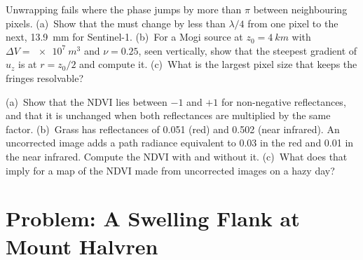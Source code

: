 \begin{exercise}[$\star\star\star$]\label{exo:b3:remote-sensing-gis:11}
Unwrapping fails where the phase jumps by more than $\pi$ between
neighbouring pixels. (a)~Show that the  must change by less
than $\lambda/4$ from one pixel to the next, \qty{13.9}{mm} for
Sentinel-1. (b)~For a Mogi source at $z_0 = \qty{4}{km}$ with $\Delta V =
\qty{e7}{m^3}$ and $\nu = 0.25$, seen vertically, show that the steepest
gradient of $u_z$ is at $r = z_0/2$ and compute it. (c)~What is the
largest pixel size that keeps the fringes resolvable?
\end{exercise}

\begin{exercise}[$\star\star\star$]\label{exo:b3:remote-sensing-gis:12}
(a)~Show that the NDVI lies between $-1$ and $+1$ for non-negative
reflectances, and that it is unchanged when both reflectances are
multiplied by the same factor. (b)~Grass has reflectances of 0.051 (red)
and 0.502 (near infrared). An uncorrected image adds a path radiance
equivalent to 0.03 in the red and 0.01 in the near infrared. Compute the
NDVI with and without it. (c)~What does that imply for a map of the NDVI
made from uncorrected images on a hazy day?
\end{exercise}

\section{Problem: A Swelling Flank at Mount Halvren}

